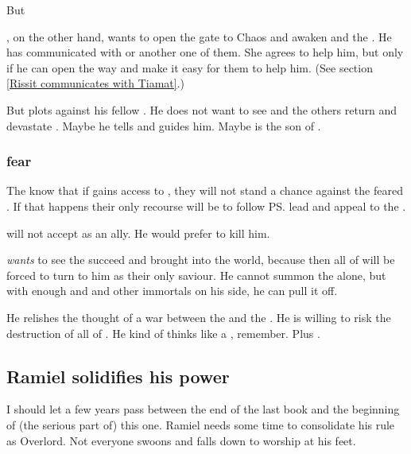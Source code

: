 But \prikker

\Secherdamon, on the other hand, wants to open the gate to Chaos and awaken \Tiamat{} and the \firstgendragons. He has communicated with \KhothSell{} or another one of them. She agrees to help him, but only if he can open the way and make it easy for them to help him. (See section \ref{Rissit communicates with Tiamat}.)

But \Iurzmacul{} plots against his fellow \firstgendragons{}. He does not want to see \Tiamat{} and the others return and devastate \Miith{}. Maybe he tells \Ishnaruchaefir{} and guides him. Maybe \Ishnaruchaefir{} is the son of \Iurzmacul.





\subsubsection{\Dragons fear \Voidbringer}
The \dragons{} know that if \Voidbringer{} gains access to \Miith, they will not stand a chance against the feared \baneking. 
If that happens their only recourse will be to follow \ps{\Vizsherioch} lead and appeal to the \xss. 

\Vizsherioch{} will not accept \Ishnaruchaefir{} as an ally. 
He would prefer to kill him. 

\Vizsherioch{} \emph{wants} to see the \banes{} succeed and \Voidbringer{} brought into the world, because then all of \Miith{} will be forced to turn to him as their only saviour. 
He cannot summon the \xss{} alone, but with enough \dragons{} and \quiljaaran{} and other immortals on his side, he can pull it off. 

He relishes the thought of a war between the \xss{} and the \banelords. 
He is willing to risk the destruction of all of \Miith. 
He kind of thinks like a \xss, remember. 
Plus . 









\subsection{Ramiel solidifies his power}
I should let a few years pass between the end of the last book and the beginning of (the serious part of) this one. 
Ramiel needs some time to consolidate his rule as Overlord. 
Not everyone swoons and falls down to worship at his feet. 

